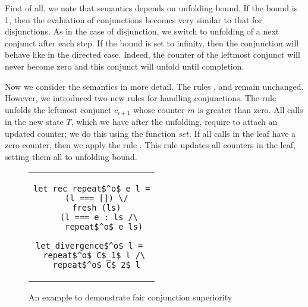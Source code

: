 First of all, we note that semantics depends on unfolding bound. If the bound is 1, then the evaluation of conjunctions becomes very similar to that for disjunctions. As in the case of
disjunction, we switch to unfolding of a next conjunct after each step. If the bound is set to infinity, then the conjunction will behave like in the directed case. Indeed,
the counter of the leftmost conjunct will never become zero and this conjunct will unfold until completion.

Now we consider the semantics in more detail. The rules ,  and  remain unchanged. However, we introduced two new rules for handling conjunctions.
The rule  unfolds the leftmost conjunct $c_{i + 1}$ whose counter $m$ is greater than zero. All calls in the new state $T$, which we have after the unfolding,
require to attach an updated counter; we do this using the function $set$. If all calls in the leaf have a zero counter, then we apply the rule .
This rule updates all counters in the leaf, setting them all to unfolding bound.

\begin{figure}[h]
\centering
\begin{tabular}{c}
\begin{lstlisting}
let rec repeat$^o$ e l =
  (l === []) \/
  fresh (ls)
    (l === e : ls /\ 
     repeat$^o$ e ls)
     
let divergence$^o$ l = 
  repeat$^o$ C$_1$ l /\ 
  repeat$^o$ C$_2$ l
\end{lstlisting}
\end{tabular}

\caption{An example to demonstrate fair conjunction superiority}
\label{fair:lst-repeato}
\end{figure}

